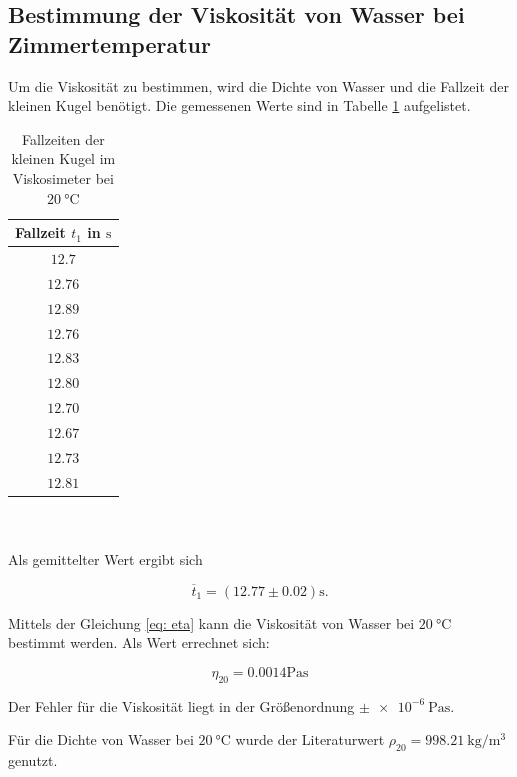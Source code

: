 \subsection{Bestimmung der Viskosität von Wasser bei Zimmertemperatur} \label{sec:visko}
Um die Viskosität zu bestimmen, wird die Dichte von Wasser und die Fallzeit der kleinen Kugel benötigt.
Die gemessenen Werte sind in Tabelle \ref{tab:messwerte_fallzeit_kugel_klein} aufgelistet. %
\begin{table} %
\centering
\begin{tabular} {c}
	\toprule
  Fallzeit $t_1$ in $\si{\second}$ \\
  \midrule
  $\num{12.7}$ \\
  $\num{12.76}$ \\
  $\num{12.89}$ \\
  $\num{12.76}$ \\
  $\num{12.83}$ \\
  $\num{12.80}$ \\
  $\num{12.70}$ \\
  $\num{12.67}$ \\
  $\num{12.73}$ \\
  $\num{12.81}$ \\
\bottomrule
\end{tabular}
\caption{Fallzeiten der kleinen Kugel im Viskosimeter bei $\SI{20}{\degreeCelsius}$}
\label{tab:messwerte_fallzeit_kugel_klein}
\end{table}
\\
\\
\hfill
Als gemittelter Wert ergibt sich

\begin{equation}
\label{eq:gemittelte_fallzeit_klein}
\overline{t}_{1}=\left(\num{12.77}\pm\num{0.02}\right) \si{\second}.
\end{equation}

Mittels der Gleichung \eqref{eq: eta} kann die Viskosität
von Wasser bei $\SI{20}{\degreeCelsius}$ bestimmt werden.
Als Wert errechnet sich:

\begin{equation}
\label{eq:viskosi_wasser}
\eta_{20}= \num{0.0014} \si{\pascal\second}
\end{equation}

Der Fehler für die Viskosität liegt in der Größenordnung $\pm\SI{e-6}{\pascal\second}$. %

Für die Dichte von Wasser bei $\SI{20}{\degreeCelsius}$ wurde der Literaturwert $\rho_{20}=\SI{998.21}{\kilogram\per\cubic\meter}$
genutzt\cite{lit_dichte}.

